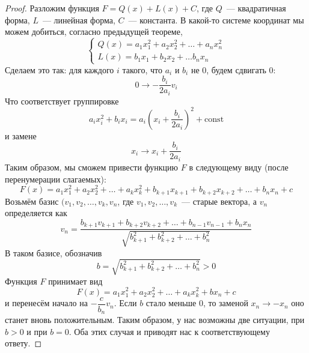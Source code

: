 \documentclass[11pt]{report}
\begin{document}
    \begin{proof}
    Разложим функция $F = Q(x) + L(x) + C$, где $Q$~--- квадратичная форма, $L$~--- линейная форма, $C$~--- константа. В какой-то системе координат мы можем добиться, согласно предыдущей теореме,
    \begin{equation*}
    \begin{cases}
        Q(x) = a_1x_1^2 + a_2x_2^2 + \hdots + a_nx_n^2\\
        L(x) = b_1x_1 + b_2x_2 + \hdots b_nx_n
    \end{cases}
    \end{equation*}
    Сделаем это так: для каждого $i$ такого, что $a_i$ и $b_i$ не $0$, будем сдвигать $0$:
    \begin{equation*}
        0 \to -\dfrac{b_i}{2a_i}v_i
    \end{equation*}
    Что соответствует группировке
    \begin{equation*}
        a_ix_i^2 + b_ix_i = a_i(x_i + \dfrac{b_i}{2a_i})^2 + \text{const}
    \end{equation*}
    и замене
    \begin{equation*}
        x_i \to x_i + \dfrac{b_i}{2a_i}
    \end{equation*}
    Таким образом, мы сможем привести функцию $F$ в следующему виду (после перенумерации слагаемых):
    \begin{equation*}
        F(x) = a_1x_1^2 + a_2x_2^2 + \hdots + a_kx_k^2 + b_{k + 1}x_{k + 1} + b_{k + 2}x_{k + 2} + \hdots + b_nx_n + c
    \end{equation*}
    Возьмём базис $(v_1, v_2, \hdots, v_k, v_n$, где $v_1, v_2, \hdots, v_k$~--- старые вектора, а $v_n$ определяется как
    \begin{equation*}
        v_n = \dfrac{b_{k + 1}v_{k+1} + b_{k + 2}v_{k + 2} + \hdots + b_{n - 1}v_{n - 1} + b_{n}x_n}{\sqrt{b_{k+1}^2 + b_{k+2}^2 + \hdots + b_{n}^2}}
    \end{equation*}
    В таком базисе, обозначив
    \begin{equation*}
        b = \sqrt{b_{k+1}^2 + b_{k+2}^2 + \hdots + b_{n}^2} > 0
    \end{equation*}
    Функция $F$ принимает вид
    \begin{equation*}
        F(x) = a_1x_1^2 + a_2x_2^2 + \hdots + a_kx_k^2 + bx_n + c
    \end{equation*}
    и перенесём начало на $-\dfrac{c}{b_n}v_n$. Если $b$ стало меньше $0$, то заменой $x_n \to -x_n$ оно станет вновь положительным. Таким образом, у нас возможны две ситуации, при $b > 0$ и при $b = 0$. Оба этих случая и приводят нас к соответствующему ответу.
    \end{proof}
\end{document}
